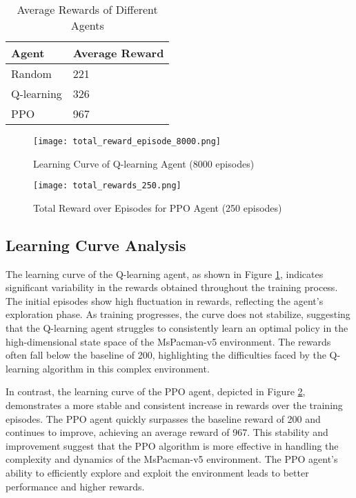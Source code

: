 \documentclass[final,numbers]{article}
\begin{document}
\begin{table}[H]
\centering
\begin{tabular}{@{}ll@{}}
\toprule
Agent        & Average Reward \\ \midrule
Random       & 221            \\
Q-learning   & 326            \\
PPO          & 967            \\ \bottomrule
\end{tabular}
\caption{Average Rewards of Different Agents}
\label{tab:results}
\end{table}

\begin{figure}[H]
    \centering
    \texttt{[image: total\_reward\_episode\_8000.png]}
    \caption{Learning Curve of Q-learning Agent (8000 episodes)}
    \label{fig:qlearning}
\end{figure}

\begin{figure}[H]
    \centering
    \texttt{[image: total\_rewards\_250.png]}
    \caption{Total Reward over Episodes for PPO Agent (250 episodes)}
    \label{fig:ppo}
\end{figure}

\subsection{Learning Curve Analysis}
The learning curve of the Q-learning agent, as shown in Figure \ref{fig:qlearning}, indicates significant variability in the rewards obtained throughout the training process. The initial episodes show high fluctuation in rewards, reflecting the agent's exploration phase. As training progresses, the curve does not stabilize, suggesting that the Q-learning agent struggles to consistently learn an optimal policy in the high-dimensional state space of the MsPacman-v5 environment. The rewards often fall below the baseline of 200, highlighting the difficulties faced by the Q-learning algorithm in this complex environment.

In contrast, the learning curve of the PPO agent, depicted in Figure \ref{fig:ppo}, demonstrates a more stable and consistent increase in rewards over the training episodes. The PPO agent quickly surpasses the baseline reward of 200 and continues to improve, achieving an average reward of 967. This stability and improvement suggest that the PPO algorithm is more effective in handling the complexity and dynamics of the MsPacman-v5 environment. The PPO agent's ability to efficiently explore and exploit the environment leads to better performance and higher rewards.
\end{document}
